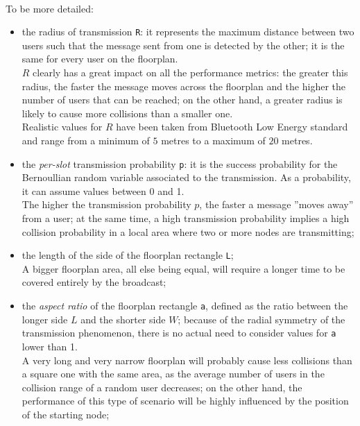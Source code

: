 \\
To be more detailed:
\begin{itemize}
	\item the radius of transmission \colorbox{gray!30}{\large \texttt{R}}: it
	represents the maximum distance between two users such that the message
	sent from one is detected by the other; it is the same for every user on
	the floorplan.\\
	$R$ clearly has a great impact on all
    the performance metrics: the greater this radius, the faster the message
    moves across the floorplan and the higher the number of users that can be
    reached; on the other hand, a greater radius is likely to cause more
    collisions than a smaller one. \\
	 Realistic values for $R$ have been taken from Bluetooth Low
	Energy standard and range from a minimum of $5$ metres to a maximum of $20$
	metres.
	\item the \textit{per-slot} transmission probability
	\colorbox{gray!30}{\large \texttt{p}}: it is the success probability for the
	Bernoullian random variable associated to the transmission. As a
	probability, it can assume values between 0 and 1.\\
	The higher the transmission probability $p$, the faster a message ”moves away” from
a user; at the same time, a high transmission probability implies a high collision
probability in a local area where two or more nodes are transmitting;
    \item the length of the side of the floorplan rectangle
    \colorbox{gray!30}{\large \texttt{L}}; \\
    A bigger floorplan area, all else being equal, will require a longer
    time to be covered entirely by the broadcast;
	\item the \textit{aspect ratio} of the floorplan rectangle
	\colorbox{gray!30}{\large \texttt{a}}, defined as the ratio between the
	longer side $L$ and the shorter side $W$; because of the radial symmetry of
	the transmission phenomenon, there is no actual need to consider values for
	\texttt{a} lower than 1.\\
	A very long and very narrow floorplan will probably cause less collisions than a
square one with the same area, as the average number of users in the collision
range of a random user decreases; on the other hand, the performance of this type of
scenario will be highly influenced by the position of the starting node;


\end{itemize}
